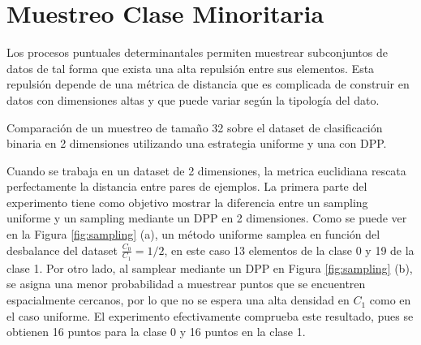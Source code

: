 %

\section{Muestreo Clase Minoritaria}

Los procesos puntuales determinantales permiten muestrear subconjuntos de datos de tal forma que exista una alta repulsión entre sus elementos. Esta repulsión depende de una métrica de distancia que es complicada de construir en datos con dimensiones altas y que puede variar según la tipología del dato. 

\begin{images}[\label{fig:sampling}]{\centering Comparación de un muestreo de tamaño 32 sobre el dataset de clasificación binaria en 2 dimensiones utilizando una estrategia uniforme y una con DPP.}

\end{images}

Cuando se trabaja en un dataset de 2 dimensiones, la metrica euclidiana rescata perfectamente la distancia entre pares de ejemplos. La primera parte del experimento tiene como objetivo mostrar la diferencia entre un sampling uniforme y un sampling mediante un DPP en 2 dimensiones. Como se puede ver en la Figura \ref{fig:sampling} (a), un método uniforme samplea en función del desbalance del dataset $\frac{C_0}{C_1} = 1/2$, en este caso 13 elementos de la clase 0 y 19 de la clase 1. Por otro lado, al samplear mediante un DPP en Figura \ref{fig:sampling} (b), se asigna una menor probabilidad a muestrear puntos que se encuentren espacialmente cercanos, por lo que no se espera una alta densidad en $C_1$ como en el caso uniforme. El experimento efectivamente comprueba este resultado, pues se obtienen 16 puntos para la clase 0 y 16 puntos en la clase 1.

\vspace{0.2cm}

